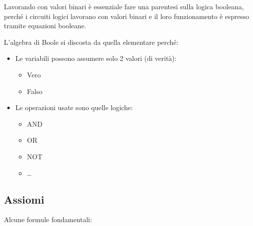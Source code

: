 \documentclass{article}
\begin{document}
Lavorando con valori binari è essenziale fare una parentesi sulla logica booleana, perché i circuiti logici lavorano con valori binari e il loro funzionamento è espresso tramite equazioni booleane.\newline

\noindent L'algebra di Boole si discosta da quella elementare perché:
\begin{itemize}
    \item Le variabili possono assumere solo 2 valori (di verità):
    \begin{itemize}
        \item Vero
        \item Falso
    \end{itemize}
    \item Le operazioni usate sono quelle logiche:
    \begin{itemize}
        \item AND
        \item OR
        \item NOT
        \item \ldots
    \end{itemize}
\end{itemize}

\newpage

\subsection{Assiomi} 

Alcune formule fondamentali:
\end{document}
